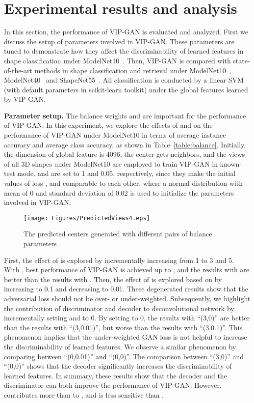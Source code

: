 \documentclass[letterpaper]{article} \usepackage{aaai19}  \usepackage{times}  \usepackage{helvet}  \usepackage{courier}  \usepackage{url}  \usepackage{graphicx}
\begin{document}
\section{Experimental results and analysis}
\label{section:results_and_analysis}
In this section, the performance of VIP-GAN is evaluated and analyzed. First we discuss the setup of parameters involved in VIP-GAN. These parameters are tuned to demonstrate how they affect the discriminability of learned features in shape classification under ModelNet10~\cite{Wu2015}. Then, VIP-GAN is compared with state-of-the-art methods in shape classification and retrieval under ModelNet10~\cite{Wu2015}, ModelNet40~\cite{Wu2015} and ShapeNet55~\cite{3dor20171050}. All classification is conducted by a linear SVM (with default parameters in scikit-learn toolkit) under the global features learned by VIP-GAN.


\noindent\textbf{Parameter setup. }The balance weights  and  are important for the performance of VIP-GAN. In this experiment, we explore the effects of  and  on the performance of VIP-GAN under ModelNet10 in terms of average instance accuracy and average class accuracy, as shown in Table~\ref{table:balance}. Initially, the dimension  of global feature  is 4096, the center  gets  neighbors, and the  views of all 3D shapes under ModelNet10 are employed to train VIP-GAN in known-test mode.  and  are set to 1 and 0.05, respectively, since they make the initial values of loss ,  and  comparable to each other, where a normal distribution with mean of 0 and standard deviation of 0.02 is used to initialize the parameters involved in VIP-GAN.

\begin{figure}[!]
  \centering
\texttt{[image: Figures/PredictedViews4.eps]}
\caption{\label{fig:softmax} The predicted centers generated with different pairs of balance parameters .}
\end{figure}

First, the effect of  is explored by incrementally increasing  from 1 to 3 and 5. With , best performance of VIP-GAN is achieved up to , and the results with  are better than the results with . Then, the effect of  is explored based on  by increasing  to 0.1 and decreasing  to 0.01. These degenerated results show that the adversarial loss should not be over- or under-weighted. Subsequently, we highlight the contribution of discriminator  and decoder  to deconvolutional network  by incrementally setting  and  to 0. By setting  to 0, the results with ``(3,0)'' are better than the results with ``(3,0.01)'', but worse than the results with ``(3,0.1)''. This phenomenon implies that the under-weighted GAN loss is not helpful to increase the discriminability of learned features. We observe a similar phenomenon by comparing between ``(0,0.01)'' and ``(0,0)''. The comparison between ``(3,0)'' and ``(0,0)'' shows that the decoder  significantly increases the discriminability of learned features. In summary, these results show that the decoder  and the discriminator  can both improve the performance of VIP-GAN. However,  contributes more than  to , and  is less sensitive than .
\end{document}
